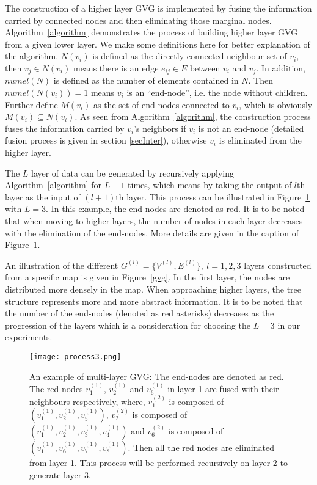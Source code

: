 \documentclass[letterpaper, 10 pt, conference]{ieeeconf}  %
\begin{document}
The construction of a higher layer GVG is implemented by fusing the information carried by connected nodes and then eliminating those marginal nodes. Algorithm~\ref{algorithm} demonstrates the process of building higher layer GVG from a given lower layer. We make some definitions here for better explanation of the algorithm. $N(v_i)$ is defined as the directly connected neighbour set of $v_i$, then $v_j\in N(v_i)$ means there is an edge $e_{ij}\in E$ between $v_i$ and $v_j$. In addition, $numel(N)$ is defined as the number of elements contained in $N$. Then $numel(N(v_i))=1$ means $v_i$ is an ``end-node'', i.e. the node without children. Further define $M(v_i)$ as the set of end-nodes connected to $v_i$, which is obviously $M(v_i)\subseteq N(v_i)$. As seen from Algorithm~\ref{algorithm}, the construction process fuses the information carried by $v_i$'s neighbors if $v_i$ is not an end-node (detailed fusion process is given in section \ref{secInter}), otherwise $v_i$ is eliminated from the higher layer.

The $L$ layer of data can be generated by recursively applying Algorithm~\ref{algorithm} for $L-1$ times, which means by taking the output of $l$th layer as the input of $(l+1)$th layer. This process can be illustrated in Figure~\ref{process} with $L=3$. In this example, the end-nodes are denoted as red. It is to be noted that when moving to higher layers, the number of nodes in each layer decreases with the elimination of the end-nodes. More details are given in the caption of Figure~\ref{process}.


An illustration of the different $G^{(l)}=\{V^{(l)},E^{(l)}\},~l=1,2,3$ layers constructed from a specific map is given in Figure~\ref{gvg}. In the first layer, the nodes are distributed more densely in the map. When approaching higher layers, the tree structure represents more and more abstract information. It is to be noted that the number of the end-nodes (denoted as red asterisks) decreases as the progression of the  layers which is a consideration for choosing the $L=3$ in our experiments.

\begin{figure}[tpb]
\centering
\texttt{[image: process3.png]}
\caption{An example of multi-layer GVG: The end-nodes are denoted as red.  The red nodes $v_1^{(1)}$, $v_2^{(1)}$ and $v_6^{(1)}$ in layer 1 are fused with their neighbours respectively, where, $v_1^{(2)}$ is composed of $(v_1^{(1)},v_2^{(1)},v_5^{(1)})$,  $v_2^{(2)}$ is composed of  $(v_1^{(1)},v_2^{(1)},v_3^{(1)},v_4^{(1)})$ and $v_6^{(2)}$ is composed of  $(v_1^{(1)}, v_6^{(1)},v_7^{(1)},v_8^{(1)})$. Then all the red nodes are eliminated from layer 1. This process will be performed recursively on layer 2 to generate layer 3. }
\label{process}
\end{figure}
\end{document}
